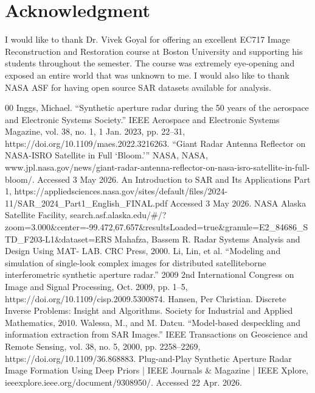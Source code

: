 \documentclass[conference]{IEEEtran}
\begin{document}
\section*{Acknowledgment}
\par I would like to thank Dr. Vivek Goyal for offering an excellent EC717 Image Reconstruction and Restoration course at Boston University and supporting his students throughout the semester. The course was extremely eye-opening and exposed an entire world that was unknown to me. I would also like to thank NASA ASF for having open source SAR datasets available for analysis.
\begin{thebibliography}{00}
 Inggs, Michael. “Synthetic aperture radar during the 50 years of the aerospace and Electronic Systems Society.” IEEE Aerospace and Electronic Systems Magazine, vol. 38, no. 1, 1 Jan. 2023, pp. 22–31, https://doi.org/10.1109/maes.2022.3216263. 
 “Giant Radar Antenna Reflector on NASA-ISRO Satellite in Full ‘Bloom.’” NASA, NASA, www.jpl.nasa.gov/news/giant-radar-antenna-reflector-on-nasa-isro-satellite-in-full-bloom/. Accessed 3 May 2026. 
 An Introduction to SAR and Its Applications Part 1, https://appliedsciences.nasa.gov/sites/default/files/2024-11/SAR{\_}2024{\_}Part1{\_}English{\_}FINAL.pdf Accessed 3 May 2026. 
 NASA Alaska Satellite Facility, search.asf.alaska.edu/{\#}/?zoom=3.000{\&}center=-99.472,67.657{\&}resultsLoaded=true{\&}granule=E2{\_}84686{\_}STD{\_}F203-L1{\&}dataset=ERS
Mahafza, Bassem R. Radar Systems Analysis and Design Using MAT- LAB. CRC Press, 2000.
 Li, Lin, et al. “Modeling and simulation of single-look complex images for distributed satelliteborne interferometric synthetic aperture radar.” 2009 2nd International Congress on Image and Signal Processing, Oct. 2009, pp. 1–5, https://doi.org/10.1109/cisp.2009.5300874. 
Hansen, Per Christian. Discrete Inverse Problems: Insight and Algorithms. Society for Industrial and Applied Mathematics, 2010. 
 Walessa, M., and M. Datcu. “Model-based despeckling and information extraction from SAR Images.” IEEE Transactions on Geoscience and Remote Sensing, vol. 38, no. 5, 2000, pp. 2258–2269, https://doi.org/10.1109/36.868883. 
 Plug-and-Play Synthetic Aperture Radar Image Formation Using Deep Priors | IEEE Journals \& Magazine | IEEE Xplore, ieeexplore.ieee.org/document/9308950/. Accessed 22 Apr. 2026. 

\end{thebibliography}
\end{document}
